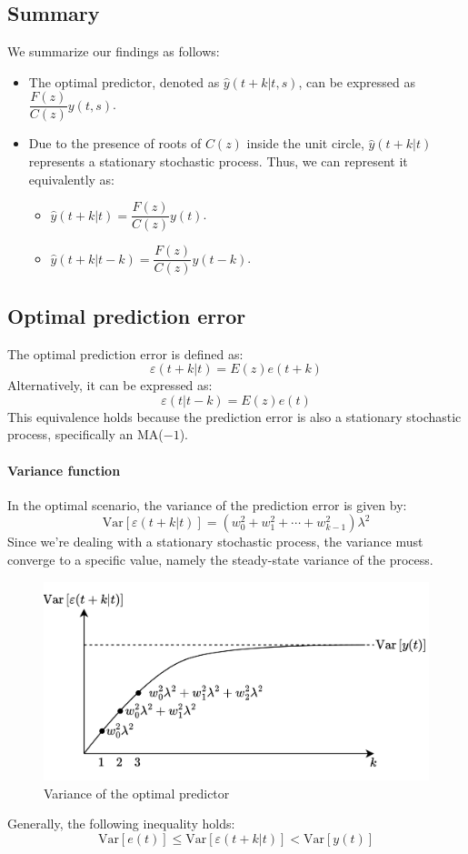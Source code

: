 \subsection{Summary}
We summarize our findings as follows:
\begin{itemize}
    \item The optimal predictor, denoted as $\hat{y}(t+k|t,s)$, can be expressed as $\dfrac{F(z)}{C(z)}y(t,s)$. 
    \item Due to the presence of roots of $C(z)$ inside the unit circle, $\hat{y}(t+k|t)$ represents a stationary stochastic process.
        Thus, we can represent it equivalently as:
        \begin{itemize}
            \item $\hat{y}(t+k|t)=\dfrac{F(z)}{C(z)}y(t)$. 
            \item $\hat{y}(t+k|t-k)=\dfrac{F(z)}{C(z)}y(t-k)$. 
        \end{itemize}
\end{itemize}

\subsection{Optimal prediction error}
The optimal prediction error is defined as:
\[\varepsilon(t+k|t)=E(z)e(t+k)\]
Alternatively, it can be expressed as:
\[\varepsilon(t|t-k)=E(z)e(t)\]
This equivalence holds because the prediction error is also a stationary stochastic process, specifically an MA($-1$).

\paragraph*{Variance function}
In the optimal scenario, the variance of the prediction error is given by:
\[\text{Var}\left[\varepsilon(t+k|t)\right]=\left(w_0^2+w_1^2+\cdots+w_{k-1}^2\right)\lambda^2\]
Since we're dealing with a stationary stochastic process, the variance must converge to a specific value, namely the steady-state variance of the process.
\begin{figure}[H]
    \centering
    \includegraphics[width=0.75\linewidth]{images/var.png}
    \caption{Variance of the optimal predictor}
\end{figure}
Generally, the following inequality holds:
\[\text{Var}\left[e(t)\right] \leq \text{Var}\left[\varepsilon(t+k|t)\right] < \text{Var}\left[y(t)\right]\]